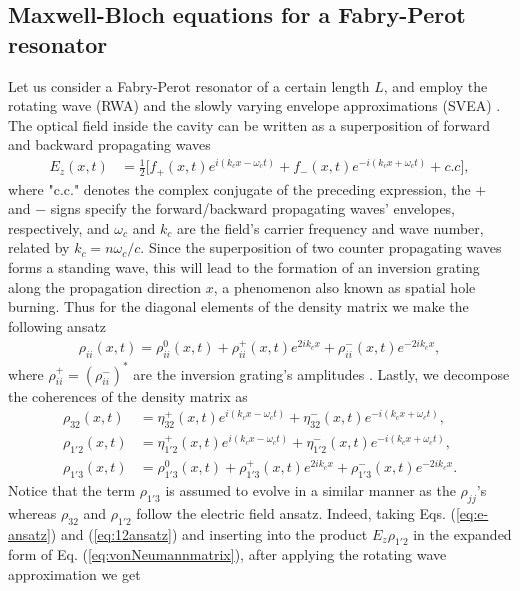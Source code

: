 \documentclass[10pt,letterpaper]{article}
\begin{document}
\subsection{Maxwell-Bloch equations for a Fabry-Perot resonator} 
\label{subsec:mbforfpresonator}
Let us consider a Fabry-Perot resonator of a certain length $L$, and employ the rotating wave (RWA) and the slowly varying envelope approximations (SVEA) \cite{boyd2003nonlinear,gordon2008multimode}. The optical field inside the cavity can be written as a superposition of forward and backward propagating waves
\begin{align}
E_z(x,t) &= \frac{1}{2} \big [ f_{+}(x,t) e^{i(k_c x-\omega_c t)} + f_{-}(x,t) e^{-i(k_c x+\omega_c t)} + c.c \big],\label{eq:e-ansatz}
\end{align}
where "c.c." denotes the complex conjugate of the preceding expression, the $+$ and $-$ signs specify the forward/backward propagating waves' envelopes, respectively, and $\omega_c$  and $k_c$ are the field's  carrier frequency and wave number, related by $k_c = n \omega_c  / c$. Since the superposition of two counter propagating waves forms a standing wave, this will lead to the formation of an inversion grating along the propagation direction $x$, a phenomenon also known as spatial hole burning. Thus for the diagonal elements of the density matrix we make the following ansatz
\begin{align}
\rho_{ii}(x,t) = \rho_{ii}^0(x,t) + \rho_{ii}^+(x,t) e^{2ik_c x} + \rho_{ii}^-(x,t)e^{-2ik_c x}, \label{eq:ii-ansatz}
\end{align}
where $\rho_{ii}^+ = (\rho_{ii}^-)^*$ are the inversion grating's amplitudes \cite{wang2007coherent}. Lastly, we decompose the coherences of the density matrix as
\begin{subequations}
\label{eq:cohansatz}
\begin{align}
\rho_{32}(x,t) &= \eta_{32}^{+}(x,t)e^{i(k_cx-\omega_ct)} + \eta_{32}^{-}(x,t)e^{-i(k_c x+\omega_c t)}, \label{eq:32ansatz} \\
\rho_{1'2}(x,t) &= \eta_{1'2}^{+}(x,t)e^{i(k_c x - \omega_c t)} + \eta_{1'2}^{-}(x,t)e^{-i(k_c x+\omega_c t)}, \label{eq:12ansatz} \\
\rho_{1'3}(x,t) &= \rho_{1'3}^0(x,t) + \rho_{1'3}^{+}(x,t) e^{2ik_cx} +  \rho_{1'3}^{-}(x,t) e^{-2ik_cx}.   \label{eq:13ansatz}
\end{align}
\end{subequations}
Notice that the term $\rho_{1'3}$ is assumed to evolve in a similar manner as the $\rho_{jj}$'s whereas $\rho_{32}$ and $\rho_{1'2}$ follow the electric field ansatz. Indeed, taking Eqs. (\ref{eq:e-ansatz}) and (\ref{eq:12ansatz}) and inserting into the product $E_z\rho_{1'2}$ in the expanded form of Eq. (\ref{eq:vonNeumannmatrix}), after applying the rotating wave approximation we get
\end{document}
